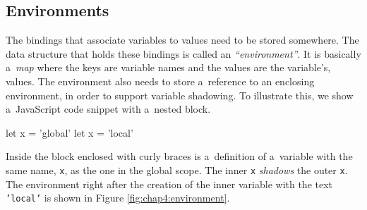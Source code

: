\subsection{Environments}
The bindings that associate variables to values need to be stored somewhere. The data structure that holds these bindings is called an \emph{``environment''}.
It is basically a~\emph{map} where the keys are variable names and the values are the variable’s, values. The environment also needs to store a~reference
to an enclosing environment, in order to support variable shadowing. To illustrate this, we show a~JavaScript code snippet with a~nested block.
\begin{code}
let x = 'global'
{
    let x = 'local'
}
\end{code}
Inside the block enclosed with curly braces is a~definition of a~variable with the same name, \texttt{x}, as the one in the global scope. The inner \texttt{x}
\emph{shadows} the outer \texttt{x}. The environment right after the creation of the inner variable with the text \texttt{'local'} is shown in Figure
\ref{fig:chap4:environment}.

